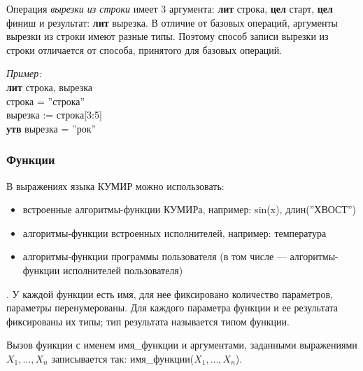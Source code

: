 \documentclass[12pt,a4paper]{article}
\begin{document}
Операция \emph{вырезки из строки} имеет 3 аргумента: \textsf{\textbf{лит} строка, \textbf{цел} старт, \textbf{цел} финиш} и результат: \textsf{\textbf{лит} вырезка}. В отличие от базовых операций, аргументы вырезки из строки имеют разные типы. Поэтому способ записи вырезки из строки отличается от способа, принятого для базовых операций.

	\emph{Пример:}\\
{\sffamily
		\textbf{лит} строка, вырезка\\
		строка = ''строка''\\
		вырезка  := строка[3:5]\\
		\textbf{утв} вырезка = ''рок''
}
 
\subsubsection{Функции}

		В выражениях языка КУМИР можно использовать:  
\begin{itemize}
\item встроенные алгоритмы-функции КУМИРа, например: \textsf{sin(x)}, \textsf{длин(''ХВОСТ'')}
\item алгоритмы-функции встроенных исполнителей, например: \textsf{температура}
\item алгоритмы-функции программы пользователя (в том числе --- алгоритмы-функции исполнителей пользователя)
\end{itemize}
.
	У каждой функции есть имя, для нее фиксировано количество параметров, параметры перенумерованы. Для каждого параметра функции и ее результата фиксированы их типы; тип результата называется типом функции.

	Вызов функции с именем \textsf{имя\_функции} и аргументами, заданными выражениями\linebreak $X_1, \dots, X_n$ записывается так:
\textsf{имя\_функции($X_1, \dots, X_n$)}.
\end{document}
